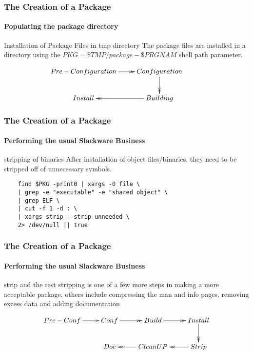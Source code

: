 \documentclass[1pt,hyperref={pdfpagelabels=true}]{beamer}
\begin{document}
\begin{frame}[fragile]
  \frametitle{The Creation of a Package}
  \framesubtitle{Populating the package directory}
  
  \begin{block}{Installation of Package Files in tmp directory}
    The package files are installed in a directory using the
    $PKG=\$TMP/package-\$PRGNAM$ shell path parameter.
  \end{block}

  \begin{equation*}
    \xymatrix@C=2pc@R=2pc{
      Pre-Configuration\ar@{->>}[r] & Configuration\ar@{->>}[d] & \\
      Install & Building\ar@{->>}[l]}
  \end{equation*}
  
\end{frame}

\begin{frame}[fragile]
  \frametitle{The Creation of a Package}
  \framesubtitle{Performing the usual Slackware Business}
  
  \begin{block}{stripping of binaries}
    After installation of object files/binaries, they need to be stripped off of
    unnecessary symbols.
  \end{block}
  
  \pause
  
  \begin{lstlisting}
    find $PKG -print0 | xargs -0 file \
    | grep -e "executable" -e "shared object" \
    | grep ELF \
    | cut -f 1 -d : \
    | xargs strip --strip-unneeded \
    2> /dev/null || true
  \end{lstlisting}
  
\end{frame}

\begin{frame}
  \frametitle{The Creation of a Package}
  \framesubtitle{Performing the usual Slackware Business}
  
  \begin{block}{strip and the rest}
    stripping is one of a few more steps in making a more acceptable package,
    others include compressing the man and info pages, removing excess data and
    adding documentation
  \end{block}
  
  \pause
  
  \begin{equation*}
    \xymatrix@C=2pc@R=2pc{
      Pre-Conf\ar@{->}[r] & Conf\ar@{->>}[r] &
      Build\ar@{->>}[r] & Install\ar@{->>}[d]\\
      & Doc & CleanUP\ar@{->>}[l] & Strip\ar@{->>}[l]}
  \end{equation*}
  
\end{frame}
\end{document}
